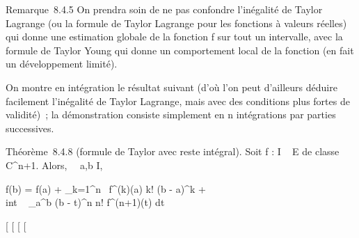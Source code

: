 \documentclass[]{article}
\begin{document}
Remarque~8.4.5 On prendra soin de ne pas confondre l'inégalité de Taylor
Lagrange (ou la formule de Taylor Lagrange pour les fonctions à valeurs
réelles) qui donne une estimation globale de la fonction f sur tout un
intervalle, avec la formule de Taylor Young qui donne un comportement
local de la fonction (en fait un développement limité).

On montre en intégration le résultat suivant (d'où l'on peut d'ailleurs
déduire facilement l'inégalité de Taylor Lagrange, mais avec des
conditions plus fortes de validité)~; la démonstration consiste
simplement en n intégrations par parties successives.

Théorème~8.4.8 (formule de Taylor avec reste intégral). Soit f : I \rightarrow~ E
de classe C^n+1. Alors, \forall~~a,b \in I,

f(b) = f(a) + \sum _k=1^n~
f^(k)(a) \over k! (b - a)^k +
\\int  ~
_a^b (b - t)^n \over n!
f^(n+1)(t) dt

[
[
[
[
\end{document}
